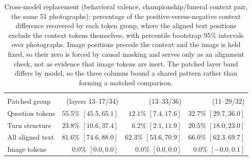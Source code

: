 \begin{table}[h]
  \caption{Cross-model replacement (behavioral valence, championship/funeral context pair, the same 51 photographs): percentage of the positive-versus-negative context difference recovered by each token group, where the aligned text positions exclude the context tokens themselves, with percentile bootstrap 95\% intervals over photographs. Image positions precede the context and the image is held fixed, so their zero is forced by causal masking and serves only as an alignment check, not as evidence that image tokens are inert. The patched layer band differs by model, so the three columns bound a shared pattern rather than forming a matched comparison.}
  \label{tab:mechmodels}
  \centering
  \small
  \begin{tabular}{lrrr}
    \toprule
    & \gemma{} & \qwen{} & \llava{} \\
    Patched group & (layers 13--17/34) & (13--33/36) & (11--29/32) \\
    \midrule
    Question tokens      & $55.5\%$ $[45.5, 65.1]$ & $12.1\%$ $[7.4, 17.6]$  & $32.7\%$ $[29.7, 36.0]$ \\
    Turn structure       & $23.8\%$ $[10.6, 37.4]$ & $6.2\%$ $[2.1, 11.9]$   & $20.5\%$ $[18.0, 23.0]$ \\
    All aligned text     & $\mathbf{81.6\%}$ $[74.6, 88.0]$ & $\mathbf{62.3\%}$ $[53.6, 70.9]$ & $\mathbf{66.0\%}$ $[62.3, 69.7]$ \\
    \midrule
    Image tokens         & $0.0\%$ $[0.0, 0.0]$ & $0.0\%$ $[0.0, 0.0]$ & $0.0\%$ $[-0.0, 0.1]$ \\
    \bottomrule
  \end{tabular}
\end{table}
